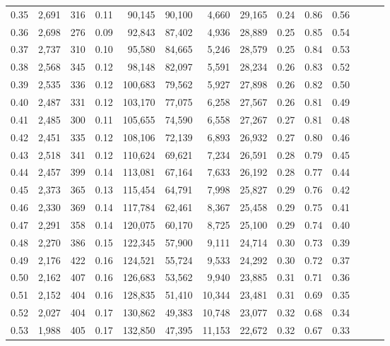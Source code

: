 \begin{tabular}{rrrrrrrrrrrrrr}
0.35 &  2,691 &  316 &  0.11 &   90,145 &   90,100 &   4,660 &  29,165 &  0.24 &  0.86 &      0.56 \\
0.36 &  2,698 &  276 &  0.09 &   92,843 &   87,402 &   4,936 &  28,889 &  0.25 &  0.85 &      0.54 \\
0.37 &  2,737 &  310 &  0.10 &   95,580 &   84,665 &   5,246 &  28,579 &  0.25 &  0.84 &      0.53 \\
0.38 &  2,568 &  345 &  0.12 &   98,148 &   82,097 &   5,591 &  28,234 &  0.26 &  0.83 &      0.52 \\
0.39 &  2,535 &  336 &  0.12 &  100,683 &   79,562 &   5,927 &  27,898 &  0.26 &  0.82 &      0.50 \\
0.40 &  2,487 &  331 &  0.12 &  103,170 &   77,075 &   6,258 &  27,567 &  0.26 &  0.81 &      0.49 \\
0.41 &  2,485 &  300 &  0.11 &  105,655 &   74,590 &   6,558 &  27,267 &  0.27 &  0.81 &      0.48 \\
0.42 &  2,451 &  335 &  0.12 &  108,106 &   72,139 &   6,893 &  26,932 &  0.27 &  0.80 &      0.46 \\
0.43 &  2,518 &  341 &  0.12 &  110,624 &   69,621 &   7,234 &  26,591 &  0.28 &  0.79 &      0.45 \\
0.44 &  2,457 &  399 &  0.14 &  113,081 &   67,164 &   7,633 &  26,192 &  0.28 &  0.77 &      0.44 \\
0.45 &  2,373 &  365 &  0.13 &  115,454 &   64,791 &   7,998 &  25,827 &  0.29 &  0.76 &      0.42 \\
0.46 &  2,330 &  369 &  0.14 &  117,784 &   62,461 &   8,367 &  25,458 &  0.29 &  0.75 &      0.41 \\
0.47 &  2,291 &  358 &  0.14 &  120,075 &   60,170 &   8,725 &  25,100 &  0.29 &  0.74 &      0.40 \\
0.48 &  2,270 &  386 &  0.15 &  122,345 &   57,900 &   9,111 &  24,714 &  0.30 &  0.73 &      0.39 \\
0.49 &  2,176 &  422 &  0.16 &  124,521 &   55,724 &   9,533 &  24,292 &  0.30 &  0.72 &      0.37 \\
0.50 &  2,162 &  407 &  0.16 &  126,683 &   53,562 &   9,940 &  23,885 &  0.31 &  0.71 &      0.36 \\
0.51 &  2,152 &  404 &  0.16 &  128,835 &   51,410 &  10,344 &  23,481 &  0.31 &  0.69 &      0.35 \\
0.52 &  2,027 &  404 &  0.17 &  130,862 &   49,383 &  10,748 &  23,077 &  0.32 &  0.68 &      0.34 \\
0.53 &  1,988 &  405 &  0.17 &  132,850 &   47,395 &  11,153 &  22,672 &  0.32 &  0.67 &      0.33 \\

\end{tabular}
